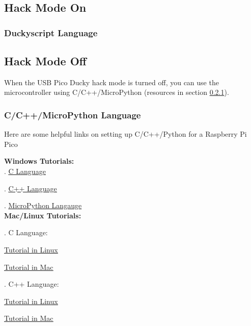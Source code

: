 \documentclass[a4paper,12pt]{article}
\begin{document}
\subsection{Hack Mode On}\label{hack_mode_on}

\subsubsection{Duckyscript Language}

\subsection{Hack Mode Off}\label{hack_mode_off}

When the USB Pico Ducky hack mode is turned off, you can use the microcontroller using C/C++/MicroPython (resources in section \ref{cc_lang}).


\subsubsection{C/C++/MicroPython Language}\label{cc_lang}

Here are some helpful links on setting up C/C++/Python for a Raspberry Pi Pico

\textbf{Windows Tutorials:}\\
\indent{}. \underline{\href{https://www.raspberrypi.com/news/raspberry-pi-pico-windows-installer/}{C Language}}

\indent{}. \underline{\href{https://www.raspberrypi.com/news/raspberry-pi-pico-windows-installer/}{C++ Language}}

\indent{}. \underline{\href{https://how2electronics.com/raspberry-pi-pico-getting-started-tutorial-with-micropython/}{MicroPython Langauge}}\\

\textbf{Mac/Linux Tutorials:}

\indent{}. C Language:
\begin{description}
	\setlength{\itemindent}{3em}
	\item[$\bullet$] \underline{\href{https://www.electronicshub.org/program-raspberry-pi-pico-using-c/}{Tutorial in Linux}}
	\item[$\bullet$] \underline{\href{https://blog.smittytone.net/2021/02/02/program-raspberry-pi-pico-c-mac/}{Tutorial in Mac}}
\end{description}

\indent{}. C++ Language:
\begin{description}
	\setlength{\itemindent}{3em}
	\item[$\bullet$]\underline{\href{https://circuitdigest.com/microcontroller-projects/how-to-program-raspberry-pi-pico-using-c}{Tutorial in Linux}}
	\item[$\bullet$]\underline{\href{https://www.peterzimon.com/raspberry-pi-pico-mac-c-getting-started/}{Tutorial in Mac}}
\end{description}
\end{document}
